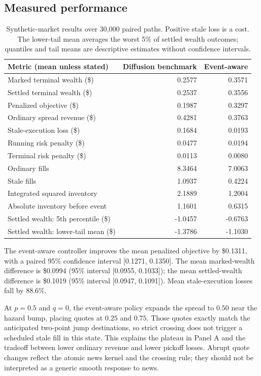 \documentclass[11pt]{article}
\newcommand{\1}{\mathbf 1}
\begin{document}
\subsection{Measured performance}
\begin{table}[htbp]
\centering\small
\begin{tabular}{lrr}
\toprule
Metric (mean unless stated) & Diffusion benchmark & Event-aware\\
\midrule
Marked terminal wealth (\$) & 0.2577 & 0.3571 \\
Settled terminal wealth (\$) & 0.2537 & 0.3556 \\
Penalized objective (\$) & 0.1987 & 0.3297 \\
Ordinary spread revenue (\$) & 0.4281 & 0.3763 \\
Stale-execution loss (\$) & 0.1684 & 0.0193 \\
Running risk penalty (\$) & 0.0477 & 0.0194 \\
Terminal risk penalty (\$) & 0.0113 & 0.0080 \\
Ordinary fills & 8.3464 & 7.0063 \\
Stale fills & 1.0937 & 0.4224 \\
Integrated squared inventory & 2.1889 & 1.2004 \\
Absolute inventory before event & 1.1601 & 0.6315 \\
Settled wealth: 5th percentile (\$) & -1.0457 & -0.6763 \\
Settled wealth: lower-tail mean (\$) & -1.3786 & -1.1030 \\
\bottomrule
\end{tabular}
\caption{Synthetic-market results over 30,000 paired paths. Positive stale loss
is a cost. The lower-tail mean averages the worst 5\% of settled wealth outcomes;
quantiles and tail means are descriptive estimates without confidence intervals.}
\label{tab:mc}
\end{table}

The event-aware controller improves the mean penalized objective by \$0.1311,
with a paired 95\% confidence interval [0.1271, 0.1350]. The mean marked-wealth
difference is \$0.0994 (95\% interval
[0.0955, 0.1033]); the mean settled-wealth difference is
\$0.1019 (95\% interval [0.0947, 0.1091]).
Mean stale-execution losses fall by 88.6\%.

At $p=0.5$ and $q=0$, the event-aware policy expands the spread to $0.50$
near the hazard bump, placing quotes at $0.25$ and $0.75$. Those quotes exactly
match the anticipated two-point jump destinations, so strict crossing does not
trigger a scheduled stale fill in this state. This explains the plateau in
Panel A and the tradeoff between lower ordinary revenue and lower pickoff
losses. Abrupt quote changes reflect the atomic news kernel and the crossing
rule; they should not be interpreted as a generic smooth response to news.
\end{document}
